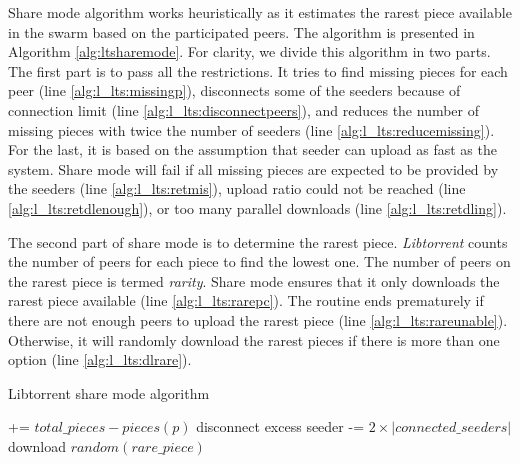 Share mode algorithm works heuristically as it estimates the rarest piece available in the swarm based on the participated peers. The algorithm is presented in Algorithm \ref{alg:ltsharemode}. For clarity, we divide this algorithm in two parts. The first part is to pass all the restrictions. It tries to find missing pieces for each peer (line \ref{alg:l_lts:missingp}), disconnects some of the seeders because of connection limit (line \ref{alg:l_lts:disconnectpeers}), and reduces the number of missing pieces with twice the number of seeders (line \ref{alg:l_lts:reducemissing}). For the last, it is based on the assumption that seeder can upload as fast as the system. Share mode will fail if all missing pieces are expected to be provided by the seeders (line \ref{alg:l_lts:retmis}), upload ratio could not be reached (line \ref{alg:l_lts:retdlenough}), or too many parallel downloads (line \ref{alg:l_lts:retdling}).

The second part of share mode is to determine the rarest piece. \textit{Libtorrent} counts the number of peers for each piece to find the lowest one. The number of peers on the rarest piece is termed \textit{rarity}. Share mode ensures that it only downloads the rarest piece available (line \ref{alg:l_lts:rarepc}). The routine ends prematurely if there are not enough peers to upload the rarest piece (line \ref{alg:l_lts:rareunable}). Otherwise, it will randomly download the rarest pieces if there is more than one option (line \ref{alg:l_lts:dlrare}). 

\begin{algorithm}[h!]
	\caption{Libtorrent share mode algorithm}
	\label{alg:ltsharemode}
	\begin{algorithmic}[1]
		\Statex \hrulefill {}
		 += {$total\_pieces - pieces(p)$} \label{alg:l_lts:missingp}
		\EndIf	
		\EndFor
		\State disconnect excess seeder \label{alg:l_lts:disconnectpeers}
		\EndIf
		 -= {$2 \times |connected\_seeders|$}	\label{alg:l_lts:reducemissing}	
		  \label{alg:l_lts:retmis}
		\State \Return 
		\EndIf
		 \label{alg:l_lts:retdlenough}
		\State \Return
		\EndIf
		 \label{alg:l_lts:retdling}
		\State \Return
		\EndIf
		\Statex \hrulefill {}
			\label{alg:l_lts:rarepc}
		\EndIf	
		\EndFor
		 \label{alg:l_lts:rareunable}
		\State \Return
		\EndIf
		\State download {$random(rare\_piece)$} \label{alg:l_lts:dlrare}
	\end{algorithmic}
\end{algorithm}

